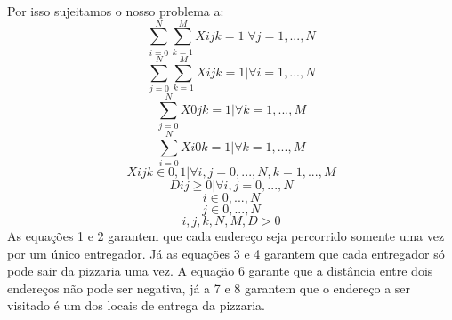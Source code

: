 \documentclass[12pt]{article}
\begin{document}
Por isso sujeitamos o nosso problema a:
\begin{equation}
\sum_{i=0}^N \sum_{k=1}^M Xijk = 1 | \forall j = 1,...,N
\end{equation}
\begin{equation}
\sum_{j=0}^N \sum_{k=1}^M Xijk = 1 | \forall i = 1,...,N
\end{equation}
\begin{equation}
\sum_{j=0}^N X0jk = 1 | \forall k = 1,...,M
\end{equation}
\begin{equation}
\sum_{i=0}^N Xi0k = 1 | \forall k = 1,...,M
\end{equation}
\begin{equation}
Xijk \in {0,1} | \forall i,j = 0,...,N, k = 1,...,M
\end{equation}
\begin{equation}
Dij \geq 0 | \forall i,j = 0,...,N
\end{equation}
\begin{equation}
i \in {0,...,N}
\end{equation}
\begin{equation}
j \in {0,...,N}
\end{equation}
\begin{equation}
i, j, k, N, M, D > 0
\end{equation}
As equações 1 e 2 garantem que cada endereço seja percorrido somente uma vez por um único entregador. Já as equações 3 e 4 garantem que cada entregador só pode sair da pizzaria uma vez. A equação 6 garante que a distância entre dois endereços não pode ser negativa, já a 7 e 8 garantem que o endereço a ser visitado é um dos locais de entrega da pizzaria.
\end{document}

